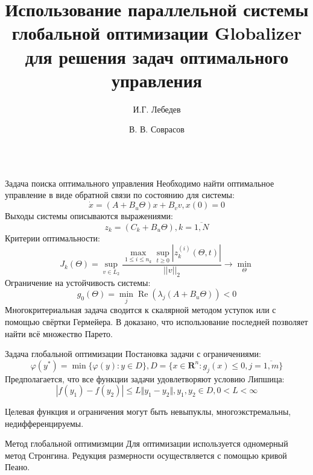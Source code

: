 \documentclass{beamer}
\title{Использование параллельной системы глобальной оптимизации Globalizer для
решения задач оптимального управления}
\author{И.Г. Лебедев \and В. В. Соврасов}
\institute{ННГУ им. Н.И. Лобачевского}
\DeclareMathOperator{\re}{\operatorname{Re}}
\begin{document}
\begin{frame}[t]
    \begin{columns}[t]
        \begin{column}[t]{0.48\paperwidth}
            \begin{block}{Задача поиска оптимального управления}
              Необходимо найти оптимальное управление в виде обратной связи по состоянию для системы:
              \begin{displaymath}
                \dot x = (A+B_u\Theta)x + B_v v, x(0)=0
              \end{displaymath}
              Выходы системы описываются выражениями:
              \begin{displaymath}
                z_k=(C_k+B_u\Theta),k=\overline{1,N}
              \end{displaymath}
              Критерии оптимальности:
              \begin{displaymath}
                J_k(\Theta)=\sup_{v\in L_2} \frac{\max_{1\leqslant i \leqslant n_k} \sup_{t\geqslant 0}|z_k^{(i)}(\Theta,t)|}{||v||_2} \rightarrow\min_{\Theta}
              \end{displaymath}
            Ограничение на устойчивость системы:
            \begin{displaymath}
              g_0(\Theta)=\min_{j}\re(\lambda_j(A+B_u\Theta)) < 0
            \end{displaymath}
            Многокритериальная задача сводится к скалярной методом уступок или с помощью свёртки Гермейера.
            В \cite{optControl} доказано, что использование последней позволяет найти всё множество Парето.
          \end{block}
            \begin{block}{Задача глобальной оптимизации}
              Постановка задачи с ограничениями:
              \begin{displaymath}
                \varphi(y^*)=\min\{\varphi(y):y\in D\}, D=\{x\in \mathbf{R}^n: g_j(x) \leqslant 0, j=\overline{1,m}\}
              \end{displaymath}
              Предполагается, что все функции задачи удовлетворяют условию Липшица:
              \begin{displaymath}
              |f(y_1)-f(y_2)|\leqslant L\Vert y_1-y_2\Vert,y_1,y_2\in D,0<L<\infty
              \end{displaymath}

              Целевая функция и ограничения могут быть невыпуклы, многоэкстремальны, недифференцируемы.
            \end{block}
            \begin{block}{Метод глобальной оптимизмции}
              Для оптимизации используется одномерный метод Стронгина.
              Редукция размерности осуществляется с помощью кривой Пеано.


\end{block}
\end{column}
\end{columns}
\end{frame}
\end{document}
